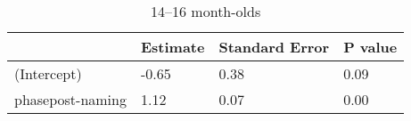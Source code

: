 


\begin{table}[tbp]

\begin{center}
\begin{threeparttable}

\caption{14--16 month-olds}

\begin{tabular}{llll}
\toprule
 & \multicolumn{1}{c}{Estimate} & \multicolumn{1}{c}{Standard Error} & \multicolumn{1}{c}{P value}\\
\midrule
(Intercept) & -0.65 & 0.38 & 0.09\\
phasepost-naming & 1.12 & 0.07 & 0.00\\
\bottomrule
\end{tabular}

\end{threeparttable}
\end{center}

\end{table}



